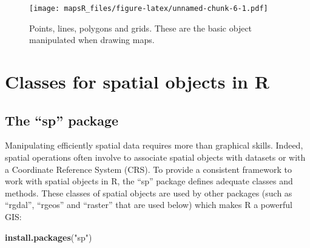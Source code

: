 \documentclass[]{report}
\newenvironment{Shaded}{\begin{snugshade}}{\end{snugshade}}
\newcommand{\DataTypeTok}[1]{\textcolor[rgb]{0.13,0.29,0.53}{#1}}
\newcommand{\DecValTok}[1]{\textcolor[rgb]{0.00,0.00,0.81}{#1}}
\newcommand{\KeywordTok}[1]{\textcolor[rgb]{0.13,0.29,0.53}{\textbf{#1}}}
\newcommand{\NormalTok}[1]{#1}
\newcommand{\OperatorTok}[1]{\textcolor[rgb]{0.81,0.36,0.00}{\textbf{#1}}}
\newcommand{\StringTok}[1]{\textcolor[rgb]{0.31,0.60,0.02}{#1}}
\begin{document}
\begin{Shaded}
\end{Shaded}

\begin{figure}
\centering
\texttt{[image: mapsR\_files/figure-latex/unnamed-chunk-6-1.pdf]}
\caption{\label{fig1}Points, lines, polygons and grids. These are the
basic object manipulated when drawing maps.}
\end{figure}

\hypertarget{classes-for-spatial-objects-in-r}{%
\chapter{Classes for spatial objects in
R}\label{classes-for-spatial-objects-in-r}}

\hypertarget{the-sp-package}{%
\section{The ``sp'' package}\label{the-sp-package}}

Manipulating efficiently spatial data requires more than graphical
skills. Indeed, spatial operations often involve to associate spatial
objects with datasets or with a Coordinate Reference System (CRS). To
provide a consistent framework to work with spatial objects in R, the
``sp'' package defines adequate classes and methods. These classes of
spatial objects are used by other packages (such as ``rgdal'', ``rgeos''
and ``raster'' that are used below) which makes R a powerful GIS:

\begin{Shaded}
\begin{Highlighting}[]
\KeywordTok{install.packages}\NormalTok{(}\StringTok{"sp"}\NormalTok{)}
\end{Highlighting}
\end{Shaded}
\end{document}
